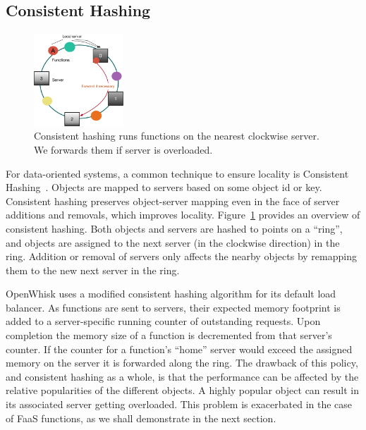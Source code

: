 \vspace*{-0.2cm}
\subsection{Consistent Hashing} 
\label{subsec:ch}

\begin{figure}
  \includegraphics[width=0.3\textwidth]{../figs/ch-bl.pdf}
  \vspace*{-0.2cm}
  \caption{Consistent hashing runs functions on the nearest clockwise server. We forwards them if  server is overloaded.}
  \label{fig:ch}
    \vspace*{-0.2cm}
\end{figure}

For data-oriented systems, a common technique to ensure locality is Consistent Hashing~\cite{karger1999web, karger1997consistent}.
Objects are mapped to servers based on some object id or key.
Consistent hashing preserves object-server mapping even in the face of server additions and removals, which improves locality.
%
Figure~\ref{fig:ch} provides an overview of consistent hashing. Both objects and servers are hashed to points on a ``ring'', and objects are assigned to the next server (in the clockwise direction) in the ring. 
Addition or removal of servers only affects the nearby objects by remapping them to the new next server in the ring.

OpenWhisk uses a modified consistent hashing algorithm for its default load balancer.
As functions are sent to servers, their expected memory footprint is added to a server-specific running counter of outstanding requests.
Upon completion the memory size of a function is decremented from that server's counter.
If the counter for a function's ``home'' server would exceed the assigned memory on the server it is forwarded along the ring.
%
The drawback of this policy, and consistent hashing as a whole, is that the performance can be affected by the relative popularities of the different objects.
A highly popular object can result in its associated server getting overloaded.
This problem is exacerbated in the case of FaaS functions, as we shall demonstrate in the next section. 


